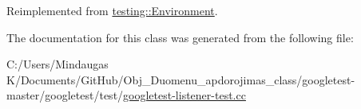 Reimplemented from \mbox{\hyperlink{classtesting_1_1_environment_a039bdaa705c46b9b88234cf4d3bb6254}{testing\+::\+Environment}}.



The documentation for this class was generated from the following file\+:\begin{DoxyCompactItemize}
\item 
C\+:/\+Users/\+Mindaugas K/\+Documents/\+Git\+Hub/\+Obj\+\_\+\+Duomenu\+\_\+apdorojimas\+\_\+class/googletest-\/master/googletest/test/\mbox{\hyperlink{googletest-master_2googletest_2test_2googletest-listener-test_8cc}{googletest-\/listener-\/test.\+cc}}\end{DoxyCompactItemize}
